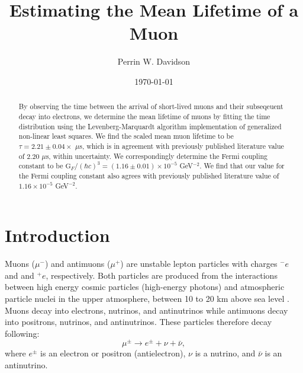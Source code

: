 \documentclass[
    aps, 
    twocolumn, 
    secnumarabic, 
    balancelastpage, 
    amsmath, 
    amssymb, 
    nofootinbib, 
    floatfix
]{revtex4-2}
\begin{document}
\title{Estimating the Mean Lifetime of a Muon}
\author{Perrin W. Davidson}
\date{\today}


\begin{abstract}

By observing the time between the arrival of short-lived muons and their subseqeuent decay into electrons, we determine the mean lifetime of muons by fitting the time distribution using the Levenberg-Marquardt algorithm implementation of generalized non-linear least squares. We find the scaled mean muon lifetime to be $\tau = 2.21 \pm 0.04 \times$ $\mu$s, which is in agreement with previously published literature value of $2.20$ $\mu$s, within uncertainty. We correspondingly determine the Fermi coupling constant to be $\text{G}_F/(\hbar c)^3 = (1.16 \pm 0.01) \times 10^{-5}$ GeV$^{-2}$. We find that our value for the Fermi coupling constant also agrees with previously published literature value of $1.16 \times 10^{-5}$ GeV$^{-2}$.   

\end{abstract}


\maketitle

\section{Introduction}
\label{sec:intro}

Muons ($\mu^-$) and antimuons ($\mu^+$) are unstable lepton particles with charges $^-e$ and and $^+e$, respectively. Both particles are produced from the interactions between high energy cosmic particles (high-energy photons) and atmospheric particle nuclei in the upper atmosphere, between 10 to 20 km above sea level \cite{manual2021}. Muons decay into electrons, nutrinos, and antinutrinos while antimuons decay into positrons, nutrinos, and antinutrinos. These particles therefore decay following:
\begin{equation}
	\mu^\pm \rightarrow e^\pm + \nu + \bar{\nu},
	\label{eq:muonDecay}
\end{equation}
where $e^\pm$ is an electron or positron (antielectron), $\nu$ is a nutrino, and $\bar{\nu}$ is an antinutrino. \par
\end{document}
